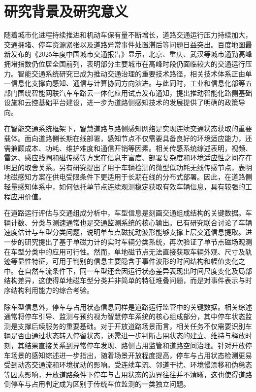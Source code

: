 \documentclass{xdupgthesis}
\begin{document}
\section{研究背景及研究意义}
\label{sec:intro_background}

随着城市化进程持续推进和机动车保有量不断增长，道路交通运行压力持续加大，交通拥堵、停车资源紧张以及道路异常事件处置滞后等问题日益突出。百度地图最新发布的《2025年度中国城市交通报告》显示，北京、重庆、武汉等城市通勤高峰拥堵指数仍位居全国前列，表明部分主要城市在高峰时段仍面临较大的交通运行压力\cite{R02}。智能交通系统研究已成为推动交通治理的重要技术路径，相关技术体系正由单一信息化支撑向感知、通信与计算协同方向演进\cite{wang2023transportation5}。与此同时，工业和信息化部等五部门围绕智能网联汽车车路云一体化应用试点发布通知，提出推动智能化路侧基础设施和云控基础平台建设，进一步为道路侧感知技术的发展提供了明确的政策导向\cite{R01}。

在智能交通系统框架下，智慧道路与路侧感知网络是实现连续交通状态获取的重要载体。面向道路侧长期在线部署，感知节点不仅需要具备良好的环境适应能力，还需兼顾成本、功耗、维护难度和通信开销等因素。相关传感系统综述表明，视频、雷达、感应线圈和磁传感等方案在信息丰富度、部署复杂度和环境适应性之间存在明显的取舍关系\cite{ch2_micko2023roadsensor}。另有研究提出了用于车辆检测的微型低功耗无线传感节点，表明地磁感知方案在供电受限条件下更适用于长期在线的分布式部署\cite{chovanec2014tinywsn}。因此，在道路侧轻量感知体系中，如何依托单节点连续观测稳定获取有效车辆信息，具有较强的工程应用价值。

在道路运行评估与交通组成分析中，车型信息是刻画交通组成结构的关键数据。车辆计数、分类与测速通常也是交通监测系统的核心输出\cite{taghvaeeyan2014portable}。已有研究联合讨论了车辆速度估计与车型分类问题，说明单节点磁扰动波形能够支撑上层交通信息提取\cite{feng2022magmonitor}。进一步的研究提出了基于单磁力计的实时车辆分类系统，再次验证了单节点磁场观测在车型分类中的应用可行性\cite{ch3_sarcevic2022singlemag}。然而，单地磁节点无法直接获取车辆外观、尺寸及轨迹等显性特征，可用于判别的信息主要隐含于事件波形的时间结构和幅值变化之中。在自然车流条件下，同一车型还会因运行状态差异表现出时间尺度变化及局部结构差异，这使得单地磁车型分类并非简单的特征堆叠问题，而是对事件表示与时序结构利用能力的综合考验。

除车型信息外，停车与占用状态信息同样是道路运行监管中的关键数据。相关综述通常将停车引导、监测与预约视为智慧停车系统的核心组成部分，其中停车状态监测是支撑后续服务的重要基础\cite{kotb2017smartparking}。对于开放道路场景而言，相关任务不仅需要识别车辆是否由通过状态转入停留状态，还需进一步判断占用状态的建立、维持与释放时刻，其结果直接关系到异常停车发现、路侧占用监管和道路空间治理。针对开放停车场景的感知综述进一步指出，随着场景开放程度提高，停车与占用状态检测更易受到动态交通流和环境扰动的影响\cite{R52}。受连续车流、邻道干扰、环境慢漂移和伪稳态等因素影响，开放道路条件下停车与占用状态的边界往往并不清晰，这也使得道路侧停车与占用判定成为区别于传统车位监测的一类独立问题。
\end{document}

